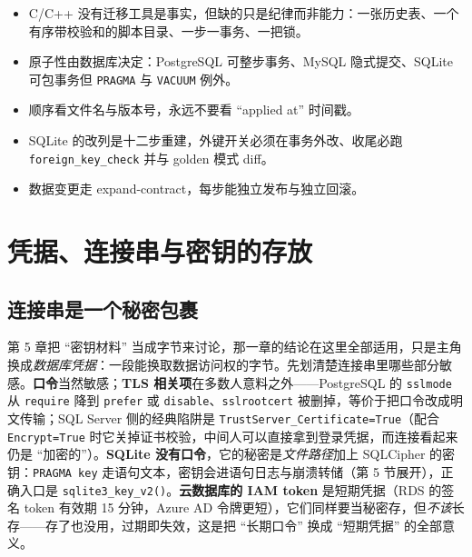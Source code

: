 \documentclass[12pt,a4paper,fontset=fandol]{ctexbook}
\newcommand{\Fn}[1]{\texttt{#1()}}
\newcommand{\Tp}[1]{\texttt{#1}}
\newcommand{\CppJava}{C/C++}
\begin{document}
\begin{guideline}[title=本章要点]
\begin{itemize}
  \item \CppJava{} 没有迁移工具是事实，但缺的只是纪律而非能力：一张历史表、一个有序带校验和的脚本目录、一步一事务、一把锁。
  \item 原子性由数据库决定：PostgreSQL 可整步事务、MySQL 隐式提交、SQLite 可包事务但 \texttt{PRAGMA} 与 \texttt{VACUUM} 例外。
  \item 顺序看文件名与版本号，永远不要看 ``applied at'' 时间戳。
  \item SQLite 的改列是十二步重建，外键开关必须在事务外改、收尾必跑 \Tp{foreign\_\allowbreak{}key\_\allowbreak{}check} 并与 golden 模式 diff。
  \item 数据变更走 expand-contract，每步能独立发布与独立回滚。
\end{itemize}
\end{guideline}

\chapter{凭据、连接串与密钥的存放}

\section{连接串是一个秘密包裹}

第 5 章把 ``密钥材料'' 当成字节来讨论，那一章的结论在这里全部适用，只是主角换成\emph{数据库凭据}：一段能换取数据访问权的字节。先划清楚连接串里哪些部分敏感。\textbf{口令}当然敏感；\textbf{TLS 相关项}在多数人意料之外——PostgreSQL 的 \Tp{sslmode} 从 \Tp{require} 降到 \Tp{prefer} 或 \Tp{disable}、\Tp{sslrootcert} 被删掉，等价于把口令改成明文传输；SQL Server 侧的经典陷阱是 \Tp{TrustServer\_\allowbreak Certificate=True}（配合 \Tp{Encrypt=True} 时它关掉证书校验，中间人可以直接拿到登录凭据，而连接看起来仍是 ``加密的''）。\textbf{SQLite 没有口令}，它的秘密是\emph{文件路径}加上 SQLCipher 的密钥：\texttt{PRAGMA key} 走语句文本，密钥会进语句日志与崩溃转储（第 5 节展开），正确入口是 \Fn{sqlite3\_key\_v2}。\textbf{云数据库的 IAM token} 是短期凭据（RDS 的签名 token 有效期 15 分钟，Azure AD 令牌更短），它们同样要当秘密存，但\emph{不该}长存——存了也没用，过期即失效，这是把 ``长期口令'' 换成 ``短期凭据'' 的全部意义。
\end{document}
